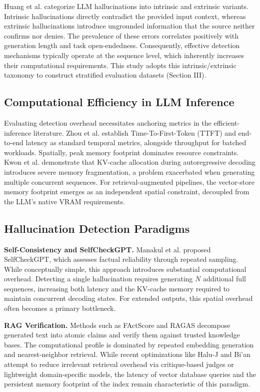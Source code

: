 \documentclass[conference]{IEEEtran}
\begin{document}
Huang et al. \cite{huang2023survey} categorize LLM hallucinations into intrinsic and extrinsic variants. Intrinsic hallucinations directly contradict the provided input context, whereas extrinsic hallucinations introduce ungrounded information that the source neither confirms nor denies. The prevalence of these errors correlates positively with generation length and task open-endedness. Consequently, effective detection mechanisms typically operate at the sequence level, which inherently increases their computational requirements. This study adopts this intrinsic/extrinsic taxonomy to construct stratified evaluation datasets (Section III).

\subsection{Computational Efficiency in LLM Inference}

Evaluating detection overhead necessitates anchoring metrics in the efficient-inference literature. Zhou et al. \cite{zhou2024efficient} establish Time-To-First-Token (TTFT) and end-to-end latency as standard temporal metrics, alongside throughput for batched workloads. Spatially, peak memory footprint dominates resource constraints. Kwon et al. \cite{kwon2023efficient} demonstrate that KV-cache allocation during autoregressive decoding introduces severe memory fragmentation, a problem exacerbated when generating multiple concurrent sequences. For retrieval-augmented pipelines, the vector-store memory footprint emerges as an independent spatial constraint, decoupled from the LLM's native VRAM requirements.

\subsection{Hallucination Detection Paradigms}

\textbf{Self-Consistency and SelfCheckGPT.} Manakul et al. \cite{manakul2023selfcheckgpt} proposed SelfCheckGPT, which assesses factual reliability through repeated sampling. While conceptually simple, this approach introduces substantial computational overhead. Detecting a single hallucination requires generating $N$ additional full sequences, increasing both latency and the KV-cache memory required to maintain concurrent decoding states. For extended outputs, this spatial overhead often becomes a primary bottleneck.

\textbf{RAG Verification.} Methods such as FActScore \cite{min2023factscore} and RAGAS \cite{es2023ragas} decompose generated text into atomic claims and verify them against trusted knowledge bases. The computational profile is dominated by repeated embedding generation and nearest-neighbor retrieval. While recent optimizations like Halu-J \cite{wang2024haluj} and Bi'an \cite{jiang2025bian} attempt to reduce irrelevant retrieval overhead via critique-based judges or lightweight domain-specific models, the latency of vector database queries and the persistent memory footprint of the index remain characteristic of this paradigm.
\end{document}
